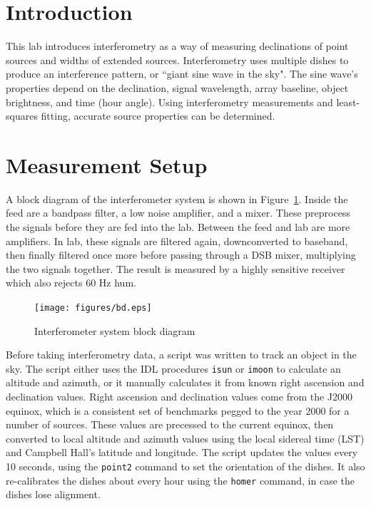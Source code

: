 \documentclass[12pt]{article}
\begin{document}
\maketitle

\section{Introduction}
This lab introduces interferometry as a way of measuring declinations of point sources and widths of extended sources.
Interferometry uses multiple dishes to produce an interference pattern, or ``giant sine wave in the sky".
The sine wave's properties depend on the declination, signal wavelength, array baseline, object brightness, and time (hour angle).
Using interferometry measurements and least-squares fitting, accurate source properties can be determined.



\section{Measurement Setup}

A block diagram of the interferometer system is shown in Figure~\ref{fig:bd}.
Inside the feed are a bandpass filter, a low noise amplifier, and a mixer.
These preprocess the signals before they are fed into the lab.
Between the feed and lab are more amplifiers.
In lab, these signals are filtered again, downconverted to baseband, then finally filtered once more before passing through a DSB mixer, multiplying the two signals together.
The result is measured by a highly sensitive receiver which also rejects 60 Hz hum.

\begin{figure}[h!]
\centering
\texttt{[image: figures/bd.eps]}
\caption{Interferometer system block diagram}
\label{fig:bd}
\end{figure}


Before taking interferometry data, a script was written to track an object in the sky.
The script either uses the IDL procedures \texttt{isun} or \texttt{imoon} to calculate an altitude and azimuth, or it manually calculates it from known right ascension and declination values.
Right ascension and declination values come from the J2000 equinox, which is a consistent set of benchmarks pegged to the year 2000 for a number of sources.
These values are precessed to the current equinox, then converted to local altitude and azimuth values using the local sidereal time (LST) and Campbell Hall's latitude and longitude.
The script updates the values every 10 seconds, using the \texttt{point2} command to set the orientation of the dishes.
It also re-calibrates the dishes about every hour using the \texttt{homer} command, in case the dishes lose alignment.
\end{document}
